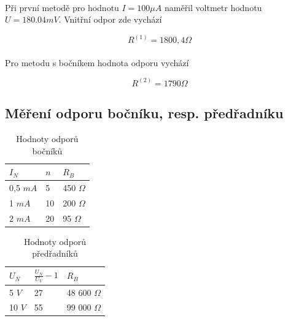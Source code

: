 \documentclass[a4paper,11pt]{article}
\begin{document}
    \paragraph{} Při první metodě pro hodnotu $I = 100 \mu A$ naměřil voltmetr
    hodnotu $U = 180.04mV$. Vnitřní odpor zde vychází

    \begin{equation}
        R^{(1)} = 1800,4 \Omega
    \end{equation}

    \paragraph{} Pro metodu s bočníkem hodnota odporu vychází

    \begin{equation}
        R^{(2)} = 1790 \Omega
    \end{equation}

    \subsection{Měření odporu bočníku, resp. předřadníku}

         \begin{table}[h]
            \centering
                \begin{tabular}{ | l | l | l | }
                    \hline
                    $I_{N}$  & $n$ & $R_{B}$    \\ \hline
                    0,5 $mA$ & 5   & 450 $\Omega$ \\ \hline
                    1 $mA$   & 10  & 200 $\Omega$ \\ \hline
                    2 $mA$   & 20  & 95 $\Omega$  \\
                    \hline
                \end{tabular}
            \caption{Hodnoty odporů bočníků}
            \label{fig:method_b}
        \end{table}

         \begin{table}[h]
            \centering
                \begin{tabular}{ | l | l | l | }
                    \hline
                    $U_{N}$  & $\frac{U_{N}}{U_{V}} - 1$ & $R_{B}$        \\ \hline
                    5 $V$    & 27                        & 48 600 $\Omega$  \\ \hline
                    10 $V$   & 55                        & 99 000 $\Omega$  \\
                    \hline
                \end{tabular}
            \caption{Hodnoty odporů předřadníků}
            \label{fig:method_b}
        \end{table}
\end{document}
